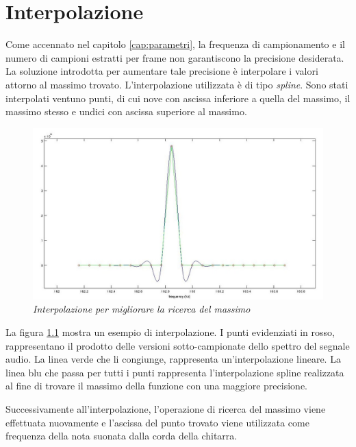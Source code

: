 \chapter{Interpolazione}\label{cap:interpolazione}

Come accennato nel capitolo \ref{cap:parametri}, la frequenza di campionamento e il numero di campioni estratti per frame non garantiscono la precisione desiderata.
La soluzione introdotta per aumentare tale precisione è interpolare i valori attorno al massimo trovato.
L'interpolazione utilizzata è di tipo \emph{spline}.
Sono stati interpolati ventuno punti, di cui nove con ascissa inferiore a quella del massimo, il massimo stesso e undici con ascissa superiore al massimo.

	\begin{figure}[h]
	  \begin{center} 
	    \includegraphics[width=\textwidth*\real{0.9}]{images/ch_05/interpolazione.jpg}
	  \end{center} 
	  \caption{\textit{Interpolazione per migliorare la ricerca del massimo}}  
	  \label{fig:interpolazione}
	\end{figure}

La figura \ref{fig:interpolazione} mostra un esempio di interpolazione. 
I punti evidenziati in rosso, rappresentano il prodotto delle versioni sotto-campionate dello spettro del segnale audio.
La linea verde che li congiunge, rappresenta un'interpolazione lineare.
La linea blu che passa per tutti i punti rappresenta l'interpolazione spline realizzata al fine di trovare il massimo della funzione con una maggiore precisione.

Successivamente all'interpolazione, l'operazione di ricerca del massimo viene effettuata nuovamente e l'ascissa del punto trovato viene utilizzata come frequenza della nota suonata dalla corda della chitarra.

